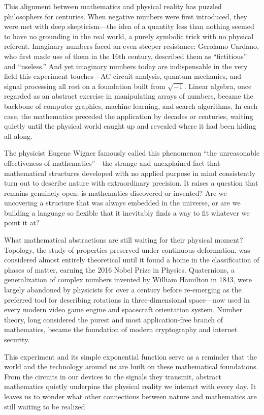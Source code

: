 \documentclass[12pt]{article}
\begin{document}
This alignment between mathematics and physical reality has puzzled
philosophers for centuries. When negative numbers were first introduced,
they were met with deep skepticism---the idea of a quantity less than
nothing seemed to have no grounding in the real world, a purely
symbolic trick with no physical referent. Imaginary numbers faced an
even steeper resistance: Gerolamo Cardano, who first made use of them
in the 16th century, described them as ``fictitious'' and ``useless.''
And yet imaginary numbers today are indispensable in the very field this
experiment touches---AC circuit analysis, quantum mechanics, and signal
processing all rest on a foundation built from $\sqrt{-1}$. Linear
algebra, once regarded as an abstract exercise in manipulating arrays of
numbers, became the backbone of computer graphics, machine learning, and
search algorithms. In each case, the mathematics preceded the application
by decades or centuries, waiting quietly until the physical world caught
up and revealed where it had been hiding all along.

The physicist Eugene Wigner famously called this phenomenon ``the
unreasonable effectiveness of mathematics''---the strange and
unexplained fact that mathematical structures developed with no applied
purpose in mind consistently turn out to describe nature with
extraordinary precision. It raises a question that remains genuinely
open: is mathematics discovered or invented? Are we uncovering a
structure that was always embedded in the universe, or are we
building a language so flexible that it inevitably finds a way to fit
whatever we point it at?

What mathematical abstractions are still waiting for their physical
moment? Topology, the study of properties preserved under continuous
deformation, was considered almost entirely theoretical until it found
a home in the classification of phases of matter, earning the 2016
Nobel Prize in Physics. Quaternions, a generalization of complex numbers
invented by William Hamilton in 1843, were largely abandoned by
physicists for over a century before re-emerging as the preferred tool
for describing rotations in three-dimensional space---now used in every
modern video game engine and spacecraft orientation system. Number
theory, long considered the purest and most application-free branch of
mathematics, became the foundation of modern cryptography and internet
security.

This experiment and its simple exponential function serve as a reminder that the
world and the technology around us are built on these mathematical foundations.
From the circuits in our devices to the signals they transmit, abstract
mathematics quietly underpins the physical reality we interact with every day.
It leaves us to wonder what other connections between nature and mathematics are
still waiting to be realized.
\end{document}
